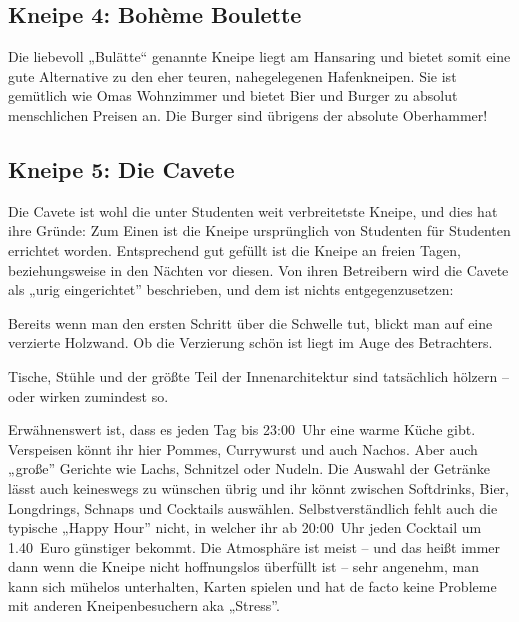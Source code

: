 \begin{multicols*}{2}
\begin{center}
\end{center}

\subsection*{Kneipe 4: Bohème Boulette}
Die liebevoll „Bulätte“ genannte Kneipe liegt am Hansaring und bietet somit eine gute Alternative zu den eher teuren, nahegelegenen Hafenkneipen. Sie ist gemütlich wie Omas Wohnzimmer und bietet Bier und Burger zu absolut menschlichen Preisen an. Die Burger sind übrigens der absolute Oberhammer!

\begin{center}
\end{center}

\subsection*{Kneipe 5: Die Cavete}
Die Cavete ist wohl die unter Studenten weit verbreitetste Kneipe, und dies hat ihre Gründe: Zum Einen ist die Kneipe ursprünglich von Studenten für Studenten errichtet worden. Entsprechend gut gefüllt ist die Kneipe an freien Tagen, beziehungsweise in den Nächten vor diesen. Von ihren Betreibern wird die Cavete als „urig eingerichtet” beschrieben, und dem ist nichts entgegenzusetzen:

Bereits wenn man den ersten Schritt über die Schwelle tut, blickt man auf eine verzierte Holzwand. Ob die Verzierung schön ist liegt im Auge des Betrachters.

Tische, Stühle und der größte Teil der Innenarchitektur sind tatsächlich hölzern -- oder wirken zumindest so.

Erwähnenswert ist, dass es jeden Tag bis 23:00~Uhr eine warme Küche gibt.
Verspeisen könnt ihr hier Pommes, Currywurst und auch Nachos. Aber auch „große” Gerichte wie Lachs, Schnitzel oder Nudeln. Die Auswahl der Getränke lässt auch keineswegs zu wünschen übrig und ihr könnt zwischen Softdrinks, Bier, Longdrings, Schnaps und Cocktails auswählen. Selbstverständlich fehlt auch die typische „Happy Hour” nicht, in welcher ihr ab 20:00~Uhr jeden Cocktail um \num{1,40}~Euro günstiger bekommt. Die Atmosphäre ist meist -- und das heißt immer dann wenn die Kneipe nicht hoffnungslos überfüllt ist -- sehr angenehm, man kann sich mühelos unterhalten, Karten spielen und hat de facto keine Probleme mit anderen Kneipenbesuchern aka „Stress”.


\end{multicols*}
